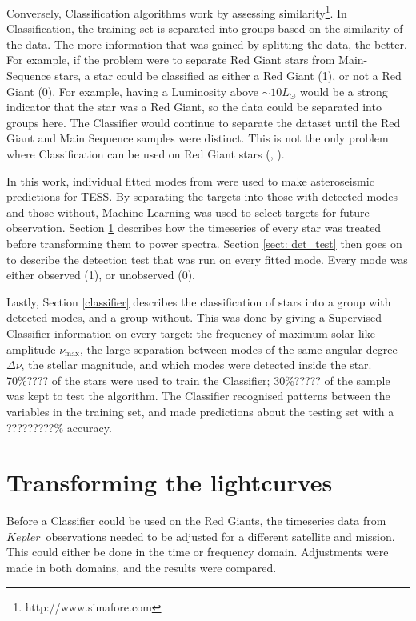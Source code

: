 \documentclass[a4paper,fleqn,usenatbib,useAMS]{mnras}
\newcommand{\numax}{\ensuremath{\nu_{\textrm{max}}}}
\newcommand{\dnu}{\ensuremath{\Delta\nu}}
\newcommand{\kep}{\ensuremath{Kepler}\:}
\begin{document}
Conversely, Classification algorithms work by assessing similarity\footnote{http://www.simafore.com}. In Classification, the training set is separated into groups based on the similarity of the data. The more information that was gained by splitting the data, the better. For example, if the problem were to separate Red Giant stars from Main-Sequence stars, a star could be classified as either a Red Giant (1), or not a Red Giant (0). For example, having a Luminosity above $\sim10L_{\odot}$ would be a strong indicator that the star was a Red Giant, so the data could be separated into groups here. The Classifier would continue to separate the dataset until the Red Giant and Main Sequence samples were distinct. This is not the only problem where Classification can be used on Red Giant stars (\citet{ness_cannon_2015}, \citet{wu_mass_2017}).

In this work, individual fitted modes from \citet{davies_asteroseismology_2016} were used to make asteroseismic predictions for TESS. By separating the targets into those with detected modes and those without, Machine Learning was used to select targets for future observation. Section \ref{sect: dataset} describes how the timeseries of every star was treated before transforming them to power spectra. Section \ref{sect: det_test} then goes on to describe the detection test that was run on every fitted mode. Every mode was either observed (1), or unobserved (0).

Lastly, Section \ref{classifier} describes the classification of stars into a group with detected modes, and a group without. This was done by giving a Supervised Classifier information on every target: the frequency of maximum solar-like amplitude \numax, the large separation between modes of the same angular degree \dnu, the stellar magnitude, and which modes were detected inside the star. 70\%???? of the stars were used to train the Classifier; 30\%????? of the sample was kept to test the algorithm. The Classifier recognised patterns between the variables in the training set, and made predictions about the testing set with a ?????????\% accuracy. 



\section{Transforming the lightcurves}
\label{sect: dataset}

Before a Classifier could be used on the Red Giants, the timeseries data from \kep \ observations needed to be adjusted for a different satellite and mission. This could either be done in the time or frequency domain. Adjustments were made in both domains, and the results were compared. %
\end{document}
